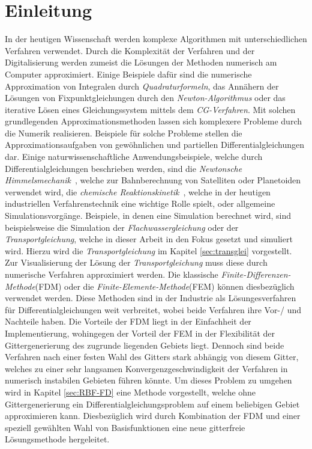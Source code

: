 \documentclass[12pt,titlepage]{article}
\begin{document}
\section{Einleitung}
In der heutigen Wissenschaft werden komplexe Algorithmen mit unterschiedlichen Verfahren verwendet. Durch die Komplexität der Verfahren und der Digitalisierung werden zumeist die Lösungen der Methoden numerisch am Computer approximiert. Einige Beispiele dafür sind die numerische Approximation von Integralen durch \textit{Quadraturformeln}, das Annähern der Lösungen von Fixpunktgleichungen durch den \textit{Newton-Algorithmus} oder das iterative Lösen eines Gleichungssystem mittels dem \textit{CG-Verfahren}. Mit solchen grundlegenden Approximationsmethoden lassen sich komplexere Probleme durch die Numerik realisieren. Beispiele für solche Probleme stellen die Approximationsaufgaben von gewöhnlichen und partiellen Differentialgleichungen dar. Einige naturwissenschaftliche Anwendungsbeispiele, welche durch Differentialgleichungen beschrieben werden, sind die \textit{Newtonsche Himmelsmechanik}~\cite{deuflhard2013gewohnliche}, welche zur Bahnberechnung von Satelliten oder Planetoiden verwendet wird, die \textit{chemische Reaktionskinetik}~\cite{deuflhard2013gewohnliche}, welche in der heutigen industriellen Verfahrenstechnik eine wichtige Rolle spielt, oder allgemeine Simulationsvorgänge. Beispiele, in denen eine Simulation berechnet wird, sind beispielsweise die Simulation der \textit{Flachwassergleichung} oder der \textit{Transportgleichung}, welche in dieser Arbeit in den Fokus gesetzt und simuliert wird. Hierzu wird die \textit{Transportgleichung} im Kapitel \ref{sec:transglei} vorgestellt.\\
Zur Visualisierung der Lösung der \textit{Transportgleichung} muss diese durch numerische Verfahren approximiert werden. Die klassische \textit{Finite-Differenzen-Methode}(FDM) oder die \textit{Finite-Elemente-Methode}(FEM) können diesbezüglich verwendet werden. Diese Methoden sind in der Industrie als Lösungesverfahren für Differentialgleichungen weit verbreitet, wobei beide Verfahren ihre Vor-/ und Nachteile haben. Die Vorteile der FDM liegt in der Einfachheit der Implementierung, wohingegen der Vorteil der FEM in der Flexibilität der Gittergenerierung des zugrunde liegenden Gebiets liegt. Dennoch sind beide Verfahren nach einer festen Wahl des Gitters stark abhängig von diesem Gitter, welches zu einer sehr langsamen Konvergenzgeschwindigkeit der Verfahren in numerisch instabilen Gebieten führen könnte. Um dieses Problem zu umgehen wird in Kapitel \ref{sec:RBF-FD} eine Methode vorgestellt, welche ohne Gittergenerierung ein Differentialgleichungsproblem auf einem beliebigen Gebiet approximieren kann. Diesbezüglich wird durch Kombination der FDM und einer speziell gewählten Wahl von Basisfunktionen eine neue gitterfreie Lösungsmethode hergeleitet.\\
\end{document}
